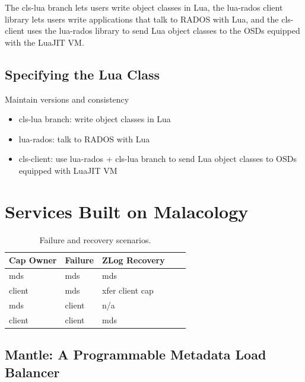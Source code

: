 \documentclass[10pt,twocolumn]{article}
\begin{document}
The cls-lua branch lets users write object classes in Lua, the lua-rados
client library lets users write applications that talk to RADOS with
Lua, and the cls-client uses the lua-rados library to send Lua object
classes to the OSDs equipped with the LuaJIT VM.

\subsection{Specifying the Lua Class}\label{specifying-the-lua-class}

Maintain versions and consistency

\begin{itemize}
\itemsep1pt\parskip0pt
\item
  cls-lua branch: write object classes in Lua
\item
  lua-rados: talk to RADOS with Lua
\item
  cls-client: use lua-rados + cls-lua branch to send Lua object classes
  to OSDs equipped with LuaJIT VM
\end{itemize}

\section{Services Built on
Malacology}\label{services-built-on-malacology}

\label{services}

\begin{table}
\begin{tabular}{ | l | l | l | l | l |}
\hline
Cap Owner & Failure & ZLog Recovery \\ \hline
mds & mds & mds \\ \hline
client & mds & xfer client cap \\ \hline
mds & client & n/a \\ \hline
client & client & mds \\
\hline
\end{tabular}
\caption{Failure and recovery scenarios.}
\label{t:mds-zlog-fail}
\end{table}

\subsection{Mantle: A Programmable Metadata Load
Balancer}\label{mantle-a-programmable-metadata-load-balancer}
\end{document}
